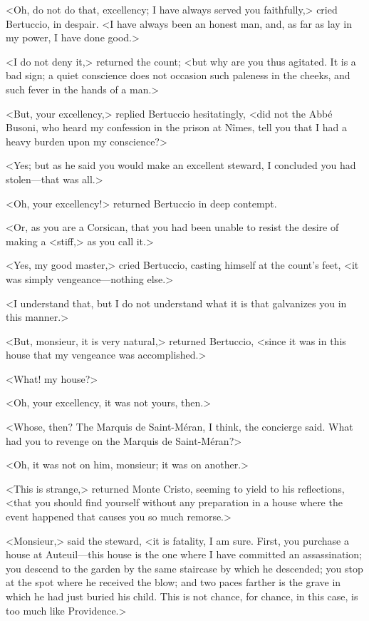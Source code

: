  <Oh, do not do that, excellency; I have always served you faithfully,> cried Bertuccio, in despair. <I have always been an honest man, and, as far as lay in my power, I have done good.> 

 <I do not deny it,> returned the count; <but why are you thus agitated. It is a bad sign; a quiet conscience does not occasion such paleness in the cheeks, and such fever in the hands of a man.> 

 <But, your excellency,> replied Bertuccio hesitatingly, <did not the Abbé Busoni, who heard my confession in the prison at Nîmes, tell you that I had a heavy burden upon my conscience?> 

 <Yes; but as he said you would make an excellent steward, I concluded you had stolen—that was all.> 

 <Oh, your excellency!> returned Bertuccio in deep contempt. 

 <Or, as you are a Corsican, that you had been unable to resist the desire of making a <stiff,> as you call it.> 

 <Yes, my good master,> cried Bertuccio, casting himself at the count's feet, <it was simply vengeance—nothing else.> 

 <I understand that, but I do not understand what it is that galvanizes you in this manner.> 

 <But, monsieur, it is very natural,> returned Bertuccio, <since it was in this house that my vengeance was accomplished.> 

 <What! my house?> 

 <Oh, your excellency, it was not yours, then.> 

 <Whose, then? The Marquis de Saint-Méran, I think, the concierge said. What had you to revenge on the Marquis de Saint-Méran?> 

 <Oh, it was not on him, monsieur; it was on another.> 

 <This is strange,> returned Monte Cristo, seeming to yield to his reflections, <that you should find yourself without any preparation in a house where the event happened that causes you so much remorse.> 

 <Monsieur,> said the steward, <it is fatality, I am sure. First, you purchase a house at Auteuil—this house is the one where I have committed an assassination; you descend to the garden by the same staircase by which he descended; you stop at the spot where he received the blow; and two paces farther is the grave in which he had just buried his child. This is not chance, for chance, in this case, is too much like Providence.> 

